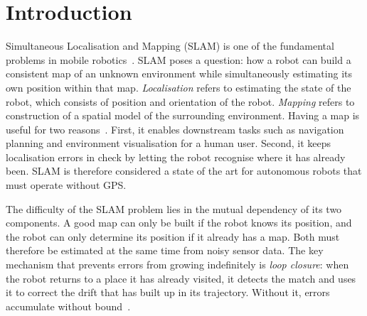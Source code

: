 \chapter{Introduction}

Simultaneous Localisation and Mapping (SLAM) is one of the fundamental problems in
mobile robotics~\cite{leonard1991mobile}.
SLAM poses a question: how a robot can build a consistent map of an unknown environment while
simultaneously estimating its own position within that map.
\emph{Localisation} refers to estimating the state of the robot, which
consists of position and orientation of the robot.
\emph{Mapping} refers to construction of a spatial model of the surrounding environment.
Having a map is useful for two reasons~\cite{cadena2016past}.
First, it enables downstream tasks such as navigation planning and
environment visualisation for a human user.
Second, it keeps localisation errors in check by letting the robot recognise
where it has already been.
SLAM is therefore considered a state of the art for autonomous robots that must
operate without GPS.


The difficulty of the SLAM problem lies in the mutual dependency of its two components.
A good map can only be built if the robot knows its position, and the robot can only
determine its position if it already has a map.
Both must therefore be estimated at the same time from noisy sensor data.
The key mechanism that prevents errors from growing indefinitely is \emph{loop closure}:
when the robot returns to a place it has already visited, it detects the match and uses
it to correct the drift that has built up in its trajectory.
Without it, errors accumulate without bound~\cite{cadena2016past}.


